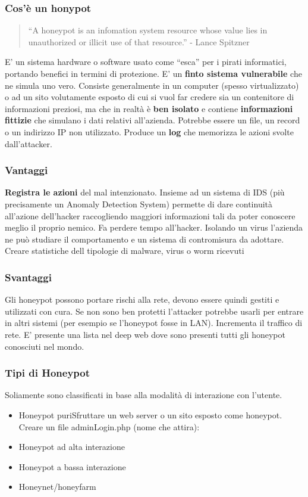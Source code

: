 \documentclass{article}
\begin{document}
\subsubsection{Cos'è un honypot}
\noindent
\begin{quotation}\small{}
“A honeypot is an infomation system resource whose value lies in unauthorized or illicit use of that resource.” 
- Lance Spitzner    
\end{quotation}
E’ un sistema hardware o software usato come “esca” per i pirati informatici, portando benefici 
in termini di protezione. E’ un \textbf{finto sistema vulnerabile} che ne simula uno vero. Consiste generalmente 
in un computer (spesso virtualizzato) o ad un sito volutamente esposto di cui si vuol far credere sia 
un contenitore di informazioni preziosi, ma che in realtà è \textbf{ben isolato} e contiene \textbf{informazioni fittizie} 
che simulano i dati relativi all’azienda. Potrebbe essere un file, un record o un indirizzo IP non utilizzato.
Produce un \textbf{log} che memorizza le azioni svolte dall’attacker.
\subsubsection{Vantaggi}
\noindent
\textbf{Registra le azioni} del mal intenzionato. Insieme ad un sistema di IDS (più precisamente un Anomaly 
Detection System) permette di dare continuità all’azione dell’hacker raccogliendo maggiori informazioni 
tali da poter conoscere meglio il proprio nemico. Fa perdere tempo all’hacker. Isolando un virus 
l’azienda ne può studiare il comportamento e un sistema di contromisura da adottare. 
Creare statistiche dell tipologie di malware, virus o worm ricevuti
\subsubsection{Svantaggi}
Gli honeypot possono portare rischi alla rete, devono essere quindi gestiti e utilizzati con cura. 
Se non sono ben protetti l’attacker potrebbe usarli per entrare in altri sistemi (per esempio se l’honeypot fosse in LAN).
Incrementa il traffico di rete.
E’ presente una lista nel deep web dove sono presenti tutti gli honeypot conosciuti nel mondo.
\subsubsection{Tipi di Honeypot}
\noindent
Soliamente sono classificati in base alla modalità di interazione con l’utente.
\begin{itemize}
    \item Honeypot puriSfruttare un web server o un sito esposto come honeypot. Creare un file adminLogin.php (nome che attira):
    \item Honeypot ad alta interazione 
    \item Honeypot a bassa interazione
    \item Honeynet/honeyfarm
\end{itemize}
\end{document}
